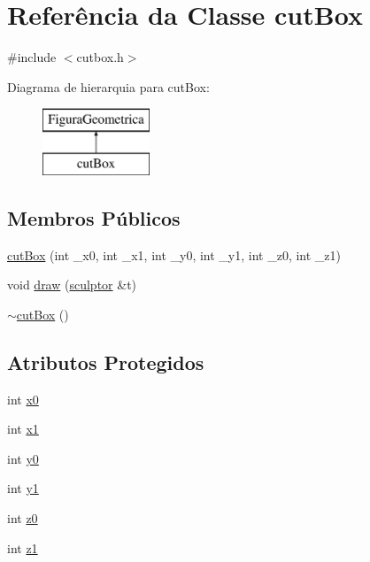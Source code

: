 \hypertarget{classcut_box}{}\section{Referência da Classe cut\+Box}
\label{classcut_box}


{\ttfamily \#include $<$cutbox.\+h$>$}

Diagrama de hierarquia para cut\+Box\+:\begin{figure}[H]
\begin{center}
\leavevmode
\includegraphics[height=2.000000cm]{classcut_box}
\end{center}
\end{figure}
\subsection*{Membros Públicos}
\begin{DoxyCompactItemize}
\item 
\mbox{\hyperlink{classcut_box_aaeddfa0e299ad9503850b6a489d7632c}{cut\+Box}} (int \+\_\+x0, int \+\_\+x1, int \+\_\+y0, int \+\_\+y1, int \+\_\+z0, int \+\_\+z1)
\item 
void \mbox{\hyperlink{classcut_box_a4806d6d924af863d7df8cd0d9f8b0959}{draw}} (\mbox{\hyperlink{classsculptor}{sculptor}} \&t)
\item 
\mbox{\hyperlink{classcut_box_ad221aa42f4a7693b697d1492c9c23c29}{$\sim$cut\+Box}} ()
\end{DoxyCompactItemize}
\subsection*{Atributos Protegidos}
\begin{DoxyCompactItemize}
\item 
int \mbox{\hyperlink{classcut_box_aa12b99e5e6f570d910cce0bc14579bd3}{x0}}
\item 
int \mbox{\hyperlink{classcut_box_af81985714c8aff01331f55db3b43c332}{x1}}
\item 
int \mbox{\hyperlink{classcut_box_aa23726055f911322bb594de28918ced9}{y0}}
\item 
int \mbox{\hyperlink{classcut_box_aa238b0b2c0ddf51c1ea0051989c9fc2d}{y1}}
\item 
int \mbox{\hyperlink{classcut_box_a2d3643c4dd6483f748a834089f08781a}{z0}}
\item 
int \mbox{\hyperlink{classcut_box_a845ab6906ad3f7b3aeb14d4228aabe62}{z1}}
\end{DoxyCompactItemize}



